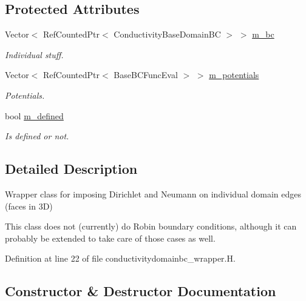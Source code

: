 \subsection*{Protected Attributes}
\begin{DoxyCompactItemize}
\item 
Vector$<$ Ref\+Counted\+Ptr$<$ Conductivity\+Base\+Domain\+BC $>$ $>$ \hyperlink{classconductivitydomainbc__wrapper_a1cc4a17bf10d222a09bee291a234c8c7}{m\+\_\+bc}
\begin{DoxyCompactList}\small\item\em Individual stuff. \end{DoxyCompactList}\item 
Vector$<$ Ref\+Counted\+Ptr$<$ Base\+B\+C\+Func\+Eval $>$ $>$ \hyperlink{classconductivitydomainbc__wrapper_aba7023ba369cea86ce27d314455786ff}{m\+\_\+potentials}
\begin{DoxyCompactList}\small\item\em Potentials. \end{DoxyCompactList}\item 
bool \hyperlink{classconductivitydomainbc__wrapper_a0836d98f7c4fe66c4f69fe428352ee96}{m\+\_\+defined}
\begin{DoxyCompactList}\small\item\em Is defined or not. \end{DoxyCompactList}\end{DoxyCompactItemize}


\subsection{Detailed Description}
Wrapper class for imposing Dirichlet and Neumann on individual domain edges (faces in 3D) 

This class does not (currently) do Robin boundary conditions, although it can probably be extended to take care of those cases as well. 

Definition at line 22 of file conductivitydomainbc\+\_\+wrapper.\+H.



\subsection{Constructor \& Destructor Documentation}
